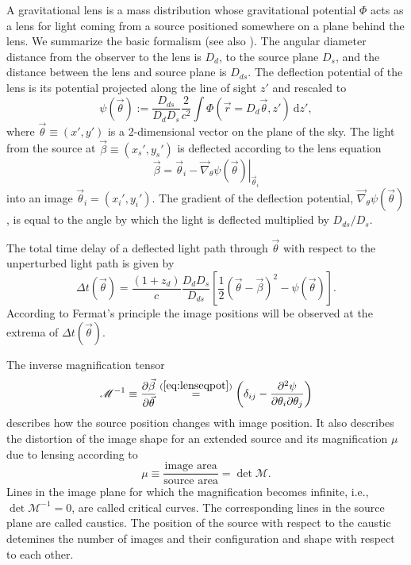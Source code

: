 \documentclass[useAMS,usenatbib]{mnras}
\newcommand{\vect}[1]{\vec{#1}} %
\begin{document}
A gravitational lens is a mass distribution whose gravitational potential $\Phi$ acts as a lens for light coming from a source positioned somewhere on a plane behind the lens. We summarize the basic formalism (see also \citealt{1992grle.book.....S,1996astro.ph..6001N,2006glsw.conf....1S,2006glsw.conf...91K,2010ARA&A..48...87T}). The angular diameter distance from the observer to the lens is $D_d$, to the source plane $D_s$, and the distance between the lens and source plane is $D_{ds}$. The deflection potential of the lens is its potential projected along the line of sight $z'$ and rescaled to
\begin{equation}
\psi(\vect{\theta}) := \frac{D_{ds}}{D_d D_s} \frac{2}{c^2} \int \Phi(\vect{r}=D_d \vect{\theta},z') {\ \mathrm d} z', \label{eq:psidef}
\end{equation}
where $\vect{\theta}\equiv(x',y')$ is a 2-dimensional vector on the plane of the sky. The light from the source at $\vect{\beta} \equiv (x_s',y_s')$ is deflected according to the lens equation
\begin{equation}
\vect{\beta} = \vect{\theta}_i - \left.\vect{\nabla}_\theta \psi(\vect{\theta})\right|_{\vect{\theta}_i} \label{eq:lenseqpot}
\end{equation}
into an image $\vect{\theta}_i = (x_i',y_i')$. The gradient of the deflection potential, $\vect{\nabla}_\theta \psi(\vect{\theta})$, is equal to the angle by which the light is deflected multiplied by $D_{ds}/D_{s}$.

The total time delay of a deflected light path through $\vect{\theta}$ with respect to the unperturbed light path is given by 
\begin{equation}
\Delta t(\vect{\theta}) = \frac{(1+z_d)}{c} \frac{D_d D_s}{D_{ds}} \left[ \frac 12 (\vect{\theta} - \vect{\beta})^2 - \psi(\vect{\theta})\right]. \label{eq:timedelay}
\end{equation}
 According to Fermat's principle the image positions will be observed at the extrema of $\Delta t(\vect{\theta})$.

The inverse magnification tensor
\begin{equation}
\mathscr{M}^{-1} \equiv \frac{\partial \vect{\beta}}{\partial \vect{\theta}} \overset{(\ref{eq:lenseqpot})}{=} \left(\delta_{ij} - \frac{\partial^2 \psi}{\partial \theta_i \partial \theta_j} \right)\label{eq:magnificationtensor}
\end{equation}
describes how the source position changes with image position. It also describes the distortion of the image shape for an extended source and its magnification $\mu$ due to lensing according to
$$\mu \equiv \frac{\text{image area}}{\text{source area}} = \det \mathscr{M}.$$
Lines in the image plane for which the magnification becomes infinite, i.e., $\det \mathscr{M}^{-1} = 0$, are called critical curves. The corresponding lines in the source plane are called caustics. The position of the source with respect to the caustic detemines the number of images and their configuration and shape with respect to each other.
\end{document}
